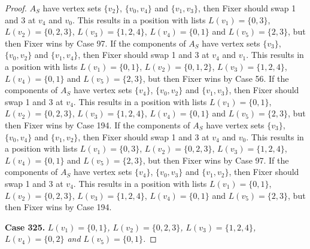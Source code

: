 \documentclass[12pt]{amsart}
\theoremstyle{plain}
\theoremstyle{definition}
\theoremstyle{remark}
\begin{document}
\begin{proof}
$A_S$ have vertex sets $\{v_2\}$, $\{v_0, v_4\}$ and $\{v_1, v_3\}$, then Fixer should swap 1 and 3 at $v_4$ and $v_0$. This results in a position with lists $L(v_1) = \{0, 3\}$, $L(v_2) = \{0, 2, 3\}$, $L(v_3) = \{1, 2, 4\}$, $L(v_4) = \{0, 1\}$ and $L(v_5) = \{2, 3\}$, but then Fixer wins by Case 97. If the components of $A_S$ have vertex sets $\{v_3\}$, $\{v_0, v_2\}$ and $\{v_1, v_4\}$, then Fixer should swap 1 and 3 at $v_4$ and $v_1$. This results in a position with lists $L(v_1) = \{0, 1\}$, $L(v_2) = \{0, 1, 2\}$, $L(v_3) = \{1, 2, 4\}$, $L(v_4) = \{0, 1\}$ and $L(v_5) = \{2, 3\}$, but then Fixer wins by Case 56. If the components of $A_S$ have vertex sets $\{v_4\}$, $\{v_0, v_2\}$ and $\{v_1, v_3\}$, then Fixer should swap 1 and 3 at $v_4$. This results in a position with lists $L(v_1) = \{0, 1\}$, $L(v_2) = \{0, 2, 3\}$, $L(v_3) = \{1, 2, 4\}$, $L(v_4) = \{0, 1\}$ and $L(v_5) = \{2, 3\}$, but then Fixer wins by Case 194. If the components of $A_S$ have vertex sets $\{v_3\}$, $\{v_0, v_4\}$ and $\{v_1, v_2\}$, then Fixer should swap 1 and 3 at $v_4$ and $v_0$. This results in a position with lists $L(v_1) = \{0, 3\}$, $L(v_2) = \{0, 2, 3\}$, $L(v_3) = \{1, 2, 4\}$, $L(v_4) = \{0, 1\}$ and $L(v_5) = \{2, 3\}$, but then Fixer wins by Case 97. If the components of $A_S$ have vertex sets $\{v_4\}$, $\{v_0, v_3\}$ and $\{v_1, v_2\}$, then Fixer should swap 1 and 3 at $v_4$. This results in a position with lists $L(v_1) = \{0, 1\}$, $L(v_2) = \{0, 2, 3\}$, $L(v_3) = \{1, 2, 4\}$, $L(v_4) = \{0, 1\}$ and $L(v_5) = \{2, 3\}$, but then Fixer wins by Case 194. 

\noindent\textbf{Case 325.  }\textit{$L(v_1) = \{0, 1\}$, $L(v_2) = \{0, 2, 3\}$, $L(v_3) = \{1, 2, 4\}$, $L(v_4) = \{0, 2\}$ and $L(v_5) = \{0, 1\}$.}


\end{proof}
\end{document}
